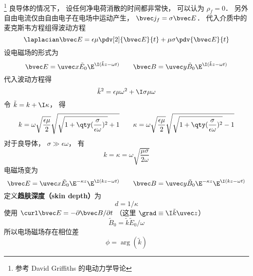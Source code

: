 

\footnote{参考 David Griffiths 的电动力学导论} 良导体的情况下， 设任何净电荷消散的时间都非常快， 可以认为 $\rho_f = 0$． 另外自由电流仅由自由电子在电场中运动产生， $\bvec j_f = \sigma \bvec E$． 代入介质中的麦克斯韦方程组得波动方程
\begin{equation}
\laplacian \bvec E = \epsilon \mu \pdv[2]{\bvec E}{t} + \mu\sigma \pdv{\bvec E}{t}
\end{equation}
设电磁场的形式为
\begin{equation}
\bvec E = \uvec x \tilde E_0 \E^{\I (\tilde k z - \omega t)}
\qquad
\bvec B = \uvec y \tilde B_0 \E^{\I (\tilde k z - \omega t)}
\end{equation}
代入波动方程得
\begin{equation}
\tilde k^2 = \epsilon\mu \omega^2 + \I \sigma \mu \omega
\end{equation}
令 $\tilde k = k + \I \kappa$， 得
\begin{equation}
k = \omega\sqrt{\frac{\epsilon\mu}{2}} \sqrt{\sqrt{1 + \qty(\frac{\sigma}{\epsilon\omega})^2} + 1}
\qquad
\kappa = \omega\sqrt{\frac{\epsilon\mu}{2}} \sqrt{\sqrt{1 + \qty(\frac{\sigma}{\epsilon\omega})^2} - 1}
\end{equation}
对于良导体， $\sigma \gg \epsilon\omega$， 有
\begin{equation}
k = \kappa = \omega \sqrt{\frac{\mu\sigma}{2\omega}}
\end{equation}
电磁场变为
\begin{equation}
\bvec E = \uvec x \tilde E_0 \E^{-\kappa z} \E^{\I (kz - \omega t)}
\qquad
\bvec B = \uvec y \tilde B_0 \E^{-\kappa z} \E^{\I (kz - \omega t)}
\end{equation}
定义\textbf{趋肤深度（skin depth）}为
\begin{equation}
d = 1/\kappa
\end{equation}
使用 $\curl \bvec E = -\partial \bvec B / \partial t$ （这里 $\grad \equiv \I \tilde k \uvec z$）
\begin{equation}
\tilde B_0 = \tilde k \tilde E_0 / \omega
\end{equation}
所以电场磁场存在相位差
\begin{equation}
\phi = \arg (\tilde k)
\end{equation}
